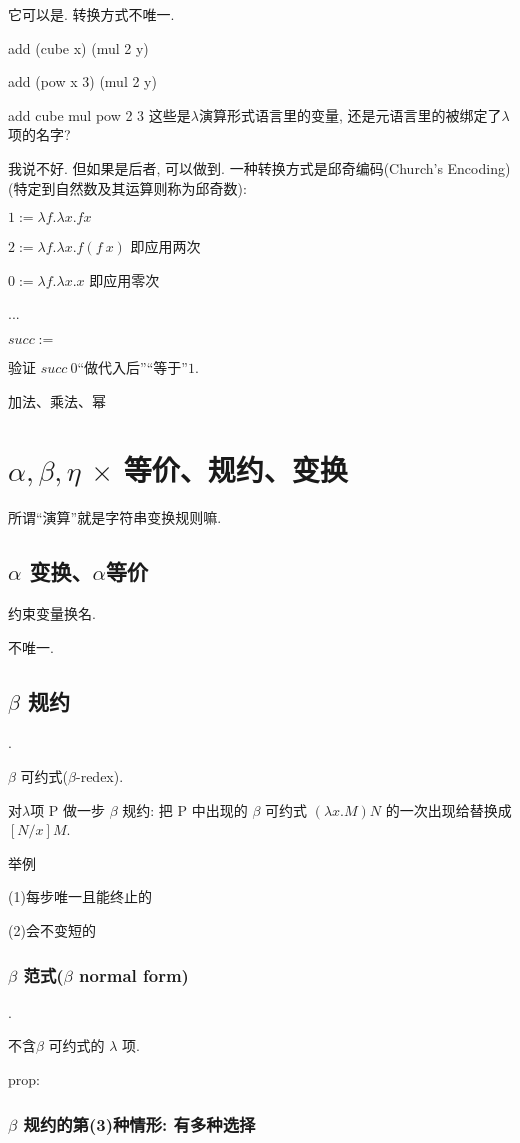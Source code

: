 \documentclass{article}
\def\a{\alpha}
\def\b{\beta}
\def\l{\lambda}
\begin{document}
它可以是. 转换方式不唯一.

add (cube x) (mul 2 y)

add (pow x 3) (mul 2 y)

add cube mul pow 2 3 这些是$\l$演算形式语言里的变量, 还是元语言里的被绑定了$\l$项的名字?

我说不好. 但如果是后者, 可以做到. 一种转换方式是邱奇编码(Church's Encoding)(特定到自然数及其运算则称为邱奇数):

$1 := \l f.\l x.f x$

$2 := \l f.\l x.f (f~x)$ 即应用两次

$0 := \l f.\l x.x$ 即应用零次

...

$succ := $

验证 $succ~0$``做代入后''``等于''$1$.

加法、乘法、幂

\section{$\a,\b,\eta$ $\times$ 等价、规约、变换}

所谓``演算''就是字符串变换规则嘛.

\subsection{$\a$ 变换、$\a$等价}

约束变量换名.

不唯一.

\subsection{$\b$ 规约}
.

$\b$ 可约式($\b$-redex).

对$\l$项 P 做一步 $\b$ 规约: 把 P 中出现的 $\b$ 可约式 $(\l x.M)N$ 的一次出现给替换成 $[N/x]M$.

举例

(1)每步唯一且能终止的

(2)会不变短的


\subsubsection{$\b$ 范式($\b$ normal form)}
.

不含$\b$ 可约式的 $\l$ 项.

prop:

\subsubsection{$\b$ 规约的第(3)种情形: 有多种选择}
\end{document}
